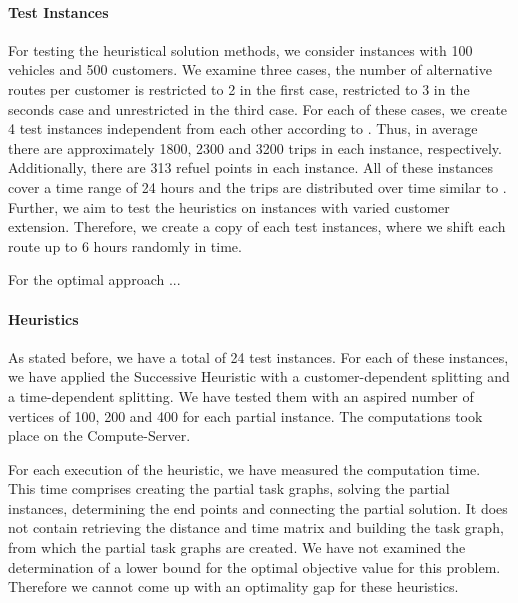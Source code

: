 \paragraph{Test Instances} \parfill

For testing the heuristical solution methods, we consider instances with 100 vehicles and 500 customers. We examine three cases, the number of alternative routes per customer is restricted to 2 in the first case, restricted to 3 in the seconds case and unrestricted in the third case. For each of these cases, we create 4 test instances independent from each other according to . Thus, in average there are approximately 1800, 2300 and 3200 trips in each instance, respectively. Additionally, there are 313 refuel points in each instance. All of these instances cover a time range of 24 hours and the trips are distributed over time similar to . Further, we aim to test the heuristics on instances with varied customer extension. Therefore, we create a copy of each test instances, where we shift each route up to 6 hours randomly in time.

For the optimal approach ...

\paragraph{Heuristics} \parfill

As stated before, we have a total of 24 test instances. For each of these instances, we have applied the Successive Heuristic with a customer-dependent splitting and a time-dependent splitting. We have tested them with an aspired number of vertices of 100, 200 and 400 for each partial instance. The computations took place on the Compute-Server.

For each execution of the heuristic, we have measured the computation time. This time comprises creating the partial task graphs, solving the partial instances, determining the end points and connecting the partial solution. It does not contain retrieving the distance and time matrix and building the task graph, from which the partial task graphs are created. We have not examined the determination of a lower bound for the optimal objective value for this problem. Therefore we cannot come up with an optimality gap for these heuristics.

